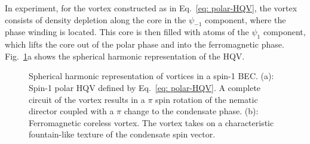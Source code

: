 In experiment, for the vortex constructed as in Eq.~\eqref{eq: polar-HQV}, the
vortex consists of density depletion along the core in the \(\psi_{-1}\)
component, where the phase winding is located.
This core is then filled with atoms of the \(\psi_1 \) component, which lifts
the core out of the polar phase and into the ferromagnetic phase.
Fig.~\ref{fig: spin-1-vortices}a shows the spherical harmonic representation of
the HQV\@.
\begin{figure}
    \centering
    \caption[Spherical harmonic representation of spin-1 vortices]
    {\label{fig: spin-1-vortices}Spherical harmonic representation of vortices
        in a spin-1 BEC\@.
        (a): Spin-1 polar HQV defined by Eq.~\eqref{eq: polar-HQV}.
        A complete circuit of the vortex results in a \(\pi \) spin rotation of
        the nematic director coupled with a \(\pi \) change to the condensate
        phase.
        (b): Ferromagnetic coreless vortex.
        The vortex takes on a characteristic fountain-like texture of the
        condensate spin vector.
    }
\end{figure}

